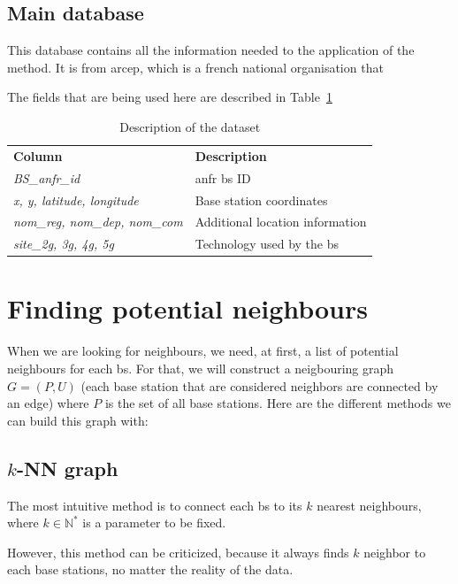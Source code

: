 \documentclass[lettersize,journal,english]{IEEEtran}
\begin{document}
    \subsection{Main database}

    This database \cite{main_database} contains all the information needed to the application of the method. It is from
    \acrfull{arcep}, which is a french national organisation that

    The fields that are being used here are described in Table~\ref{data_columns}

\begin{table}[!b]
    \centering
    \caption{Description of the dataset}
    \label{data_columns}
    \begin{tabular}{ll}
        \toprule
        \textbf{Column} & \textbf{Description} \\
        \cmidrule(lr){1-2}
        \textsl{BS\_anfr\_id} & \acrshort{anfr} \acrshort{bs} ID \\ 
        \textsl{x, y, latitude, longitude} & Base station coordinates \\ 
        \textsl{nom\_reg, nom\_dep, nom\_com} & Additional location information \\  
        \textsl{site\_2g, 3g, 4g, 5g} & Technology used by the \acrshort{bs} \\ 
        \bottomrule
    \end{tabular}
\end{table}

\section{Finding potential neighbours}
\noindent When we are looking for neighbours, we need, at first, a list of potential neighbours for each \acrfull{bs}.
For that, we will construct a neigbouring graph $G = (P, U)$ (each base station that are considered neighbors are
connected by an edge) where $P$ is the set of all base stations. 
Here are the different methods we can build this graph with:

\subsection{$k$-NN graph}
\noindent The most intuitive method is to connect each \acrshort{bs} to its $k$ nearest neighbours, where $k \in \mathbb{N}^*$ 
is a parameter to be fixed. 

However, this method can be criticized, because it always finds $k$ neighbor to each base stations, no matter the reality of the 
data.
\end{document}
